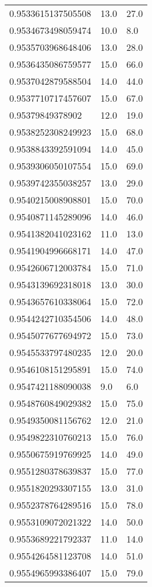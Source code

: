 \begin{center}
\begin{supertabular}[H]{p{0.30\textwidth}p{0.05\textwidth}p{0.05\textwidth}}
0.9533615137505508 & 13.0 & 27.0 \\ 
0.9534673498059474 & 10.0 & 8.0 \\ 
0.9535703968648406 & 13.0 & 28.0 \\ 
0.9536435086759577 & 15.0 & 66.0 \\ 
0.9537042879588504 & 14.0 & 44.0 \\ 
0.9537710717457607 & 15.0 & 67.0 \\ 
0.95379849378902 & 12.0 & 19.0 \\ 
0.9538252308249923 & 15.0 & 68.0 \\ 
0.9538843392591094 & 14.0 & 45.0 \\ 
0.9539306050107554 & 15.0 & 69.0 \\ 
0.9539742355038257 & 13.0 & 29.0 \\ 
0.9540215008908801 & 15.0 & 70.0 \\ 
0.9540871145289096 & 14.0 & 46.0 \\ 
0.9541382041023162 & 11.0 & 13.0 \\ 
0.9541904996668171 & 14.0 & 47.0 \\ 
0.9542606712003784 & 15.0 & 71.0 \\ 
0.9543139692318018 & 13.0 & 30.0 \\ 
0.9543657610338064 & 15.0 & 72.0 \\ 
0.9544242710354506 & 14.0 & 48.0 \\ 
0.9545077677694972 & 15.0 & 73.0 \\ 
0.9545533797480235 & 12.0 & 20.0 \\ 
0.9546108151295891 & 15.0 & 74.0 \\ 
0.9547421188090038 & 9.0 & 6.0 \\ 
0.9548760849029382 & 15.0 & 75.0 \\ 
0.9549350081156762 & 12.0 & 21.0 \\ 
0.9549822310760213 & 15.0 & 76.0 \\ 
0.9550675919769925 & 14.0 & 49.0 \\ 
0.9551280378639837 & 15.0 & 77.0 \\ 
0.9551820293307155 & 13.0 & 31.0 \\ 
0.9552378764289516 & 15.0 & 78.0 \\ 
0.9553109072021322 & 14.0 & 50.0 \\ 
0.9553689221792337 & 11.0 & 14.0 \\ 
0.9554264581123708 & 14.0 & 51.0 \\ 
0.9554965993386407 & 15.0 & 79.0 \\ 

\end{supertabular}
\end{center}
